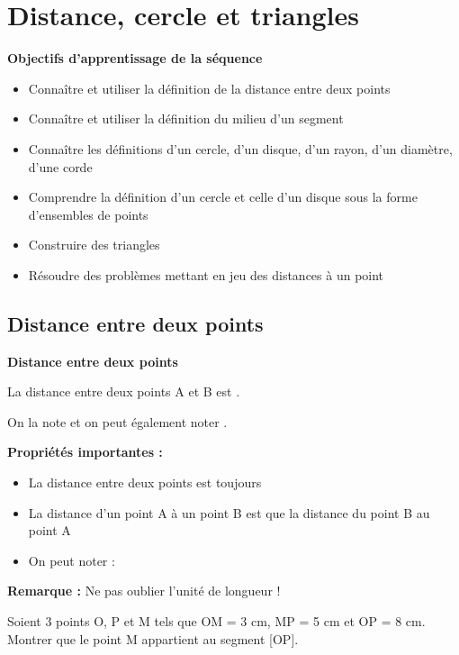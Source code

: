 \chapter{Distance, cercle et triangles}

\begin{objectifsbox}
	\textbf{Objectifs d'apprentissage de la séquence}
	\begin{itemize}
		\item Connaître et utiliser la définition de la distance entre deux points
		\item Connaître et utiliser la définition du milieu d'un segment
		\item Connaître les définitions d'un cercle, d'un disque, d'un rayon, d'un diamètre, d'une corde
		\item Comprendre la définition d'un cercle et celle d'un disque sous la forme d'ensembles de points
		\item Construire des triangles
		\item Résoudre des problèmes mettant en jeu des distances à un point
	\end{itemize}
\end{objectifsbox}

\section{Distance entre deux points}

\begin{definitionbox}
	\textbf{Distance entre deux points}
	
	La distance entre deux points A et B est \trous{5cm}.
	
	On la note \trous{3cm} et on peut également noter \trous{3cm}.
\end{definitionbox}

\textbf{Propriétés importantes :}
\begin{itemize}
	\item La distance entre deux points est toujours \trous{3cm}
	\item La distance d'un point A à un point B est \trous{5cm} que la distance du point B au point A
	\item On peut noter : \trous{4cm}
\end{itemize}

\textbf{Remarque :} Ne pas oublier l'unité de longueur !

\begin{examplebox}
	Soient 3 points O, P et M tels que OM = 3 cm, MP = 5 cm et OP = 8 cm.
	Montrer que le point M appartient au segment [OP].
	
	\trous{12cm}
	
	\trous{12cm}
	
	\trous{12cm}
\end{examplebox}


